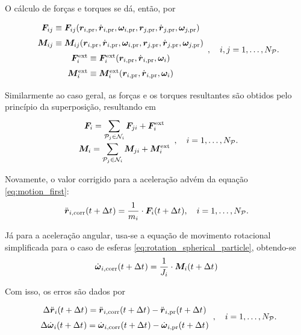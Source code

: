 O cálculo de forças e torques se dá, então, por
\begin{equation*}
	\def\arraystretch{1.5}
	\begin{array}{c}
		\forceij \equiv \forceij\pqty{\positionipr, \velocityipr, \angularVelocityipr, \positionjpr, \velocityjpr, \angularVelocityjpr} \\
		\torqueij \equiv \torqueij\pqty{\positionipr, \velocityipr, \angularVelocityipr, \positionjpr, \velocityjpr, \angularVelocityjpr} \\
		\external\forcei \equiv \external\forcei\pqty{\positionipr, \velocityipr, \angularVelocityi} \\
		\external\torquei \equiv \external\torquei\pqty{\positionipr, \velocityipr, \angularVelocityi}
	\end{array}, \quad i,j = 1, \dotsc, \numberOfParticles.
\end{equation*}

Similarmente ao caso geral, as forças e os torques resultantes são obtidos pelo princípio da superposição, resultando em
\begin{equation*}
	\def\arraystretch{1.5}
	\begin{array}{c}
		\resultingForcei = \dsum_{\particlej\in\ineighborhood{i}}\forceji + \external\forcei\\
		\resultingTorquei = \dsum_{\particlej\in\ineighborhood{i}}\torqueji + \external\torquei
	\end{array}, \quad i = 1, \dotsc, \numberOfParticles.
\end{equation*}

Novamente, o valor corrigido para a aceleração advém da equação \eqref{eq:motion_first}:
\begin{equation*}
	\accelerationicorr\pqty{t+\Dt} = \dfrac{1}{\massi}\cdot\resultingForcei\pqty{t+\Dt}, \quad i = 1, \dotsc, \numberOfParticles.
\end{equation*}

Já para a aceleração angular, usa-se a equação de movimento rotacional simplificada para o caso de esferas \eqref{eq:rotation_spherical_particle}, obtendo-se
\begin{equation*}
	\dangularVelocityicorr{1}\pqty{t+\Dt} = \dfrac{1}{\momentOfInertiai}\cdot\resultingTorquei\pqty{t+\Dt}
\end{equation*}

Com isso, os erros são dados por
\begin{equation*}
	\def\arraystretch{1.5}
	\begin{array}{c}
		\Delta \accelerationi\pqty{t+\Dt} = \accelerationicorr\pqty{t+\Dt} - \accelerationipr\pqty{t+\Dt} \\
		\Delta \dangularVelocityi{1}\pqty{t+\Dt} = \dangularVelocityicorr{1}\pqty{t+\Dt} - \dangularVelocityipr{1}\pqty{t+\Dt} \\
	\end{array}, \quad i = 1, \dotsc, \numberOfParticles.
\end{equation*}

